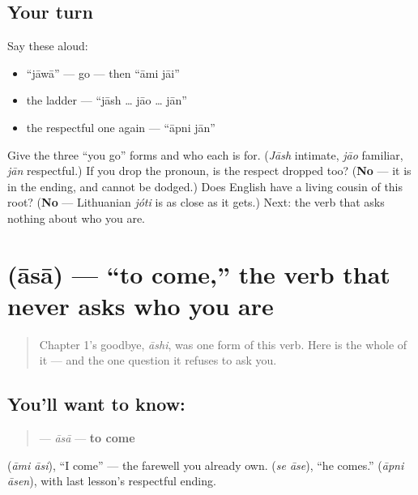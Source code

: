 \subsection*{Your turn}
Say these aloud:

\begin{itemize}
\raggedright
  \item \textquotedblleft{}jāwā\textquotedblright{} — go — then \textquotedblleft{}āmi jāi\textquotedblright{}
  \item the ladder — \textquotedblleft{}jāsh … jāo … jān\textquotedblright{}
  \item the respectful one again — \textquotedblleft{}āpni jān\textquotedblright{}
\end{itemize}

\begin{tcolorbox}[breakable,colback=teal!4,colframe=teal!35!black,title={Before you move on}]
Give the three \textquotedblleft{}you go\textquotedblright{} forms and who each is for. (\emph{Jāsh} intimate, \emph{jāo} familiar, \emph{jān} respectful.) If you drop the pronoun, is the respect dropped too? (\textbf{No} — it is in the ending, and cannot be dodged.) Does English have a living cousin of this root? (\textbf{No} — Lithuanian \emph{jóti} is as close as it gets.) Next: the verb that asks nothing about who you are.
\end{tcolorbox}
\section[\texorpdfstring{\bn{আসা} (āsā)}{আসা (āsā)}]{ (āsā) — \textquotedblleft{}to come,\textquotedblright{} the verb that never asks who you are}

\label{lesson:BN-C07-asha}



\begin{quote}
Chapter 1's goodbye, \emph{āshi}, was one form of this verb. Here is the whole of it — and the one question it refuses to ask you.
\end{quote}

\subsection*{You'll want to know: }
\begin{quote}
\textbf{} — \emph{āsā} — \textbf{to come}
\end{quote}

  (\emph{āmi āsi}), \textquotedblleft{}I come\textquotedblright{} — the farewell you already own.   (\emph{se āse}), \textquotedblleft{}he comes.\textquotedblright{}   (\emph{āpni āsen}), with last lesson's respectful ending.

